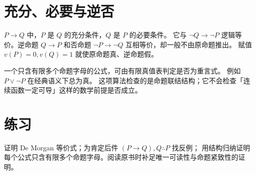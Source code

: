 \section{充分、必要与逆否}
\(P\to Q\) 中，\(P\) 是 \(Q\) 的充分条件，\(Q\) 是 \(P\) 的必要条件。
它与 \(\neg Q\to\neg P\) 逻辑等价。逆命题 \(Q\to P\) 和否命题
\(\neg P\to\neg Q\) 互相等价，却一般不由原命题推出。
赋值 \(v(P)=0,v(Q)=1\) 就使原命题真、逆命题假。

\begin{example}[真值表能检查什么]
一个只含有限多个命题字母的公式，可由有限真值表判定是否为重言式。
例如 \(P\lor\neg P\) 在经典语义下总为真。
这项算法检查的是命题联结结构；它不会检查「连续函数一定可导」这样的数学前提是否成立。
\end{example}

\section{练习}
证明 De Morgan 等价式；为肯定后件 \((P\to Q),Q\therefore P\) 找反例；
用结构归纳证明每个公式只含有限多个命题字母。阅读原书时补足唯一可读性与命题紧致性的证明。
